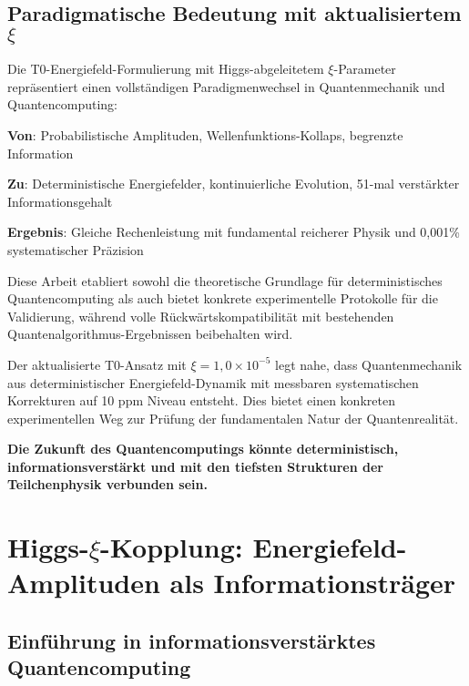 \documentclass[12pt,a4paper]{article}
\begin{document}
	\subsection{Paradigmatische Bedeutung mit aktualisiertem $\xi$}
	
	\begin{tcolorbox}[colback=red!5!white,colframe=red!75!black,title=Verstärkte paradigmatische Revolution]
		Die T0-Energiefeld-Formulierung mit Higgs-abgeleitetem $\xi$-Parameter repräsentiert einen vollständigen Paradigmenwechsel in Quantenmechanik und Quantencomputing:
		
		\textbf{Von}: Probabilistische Amplituden, Wellenfunktions-Kollaps, begrenzte Information
		
		\textbf{Zu}: Deterministische Energiefelder, kontinuierliche Evolution, 51-mal verstärkter Informationsgehalt
		
		\textbf{Ergebnis}: Gleiche Rechenleistung mit fundamental reicherer Physik und 0,001\% systematischer Präzision
		
		Diese Arbeit etabliert sowohl die theoretische Grundlage für deterministisches Quantencomputing als auch bietet konkrete experimentelle Protokolle für die Validierung, während volle Rückwärtskompatibilität mit bestehenden Quantenalgorithmus-Ergebnissen beibehalten wird.
	\end{tcolorbox}
	
	Der aktualisierte T0-Ansatz mit $\xi = 1,0 \times 10^{-5}$ legt nahe, dass Quantenmechanik aus deterministischer Energiefeld-Dynamik mit messbaren systematischen Korrekturen auf 10 ppm Niveau entsteht. Dies bietet einen konkreten experimentellen Weg zur Prüfung der fundamentalen Natur der Quantenrealität.
	
	\textbf{Die Zukunft des Quantencomputings könnte deterministisch, informationsverstärkt und mit den tiefsten Strukturen der Teilchenphysik verbunden sein.}
	
	\newpage
	\appendix
	
	\section{Higgs-$\xi$-Kopplung: Energiefeld-Amplituden als Informationsträger}
	
	\subsection{Einführung in informationsverstärktes Quantencomputing}
	
\end{document}
